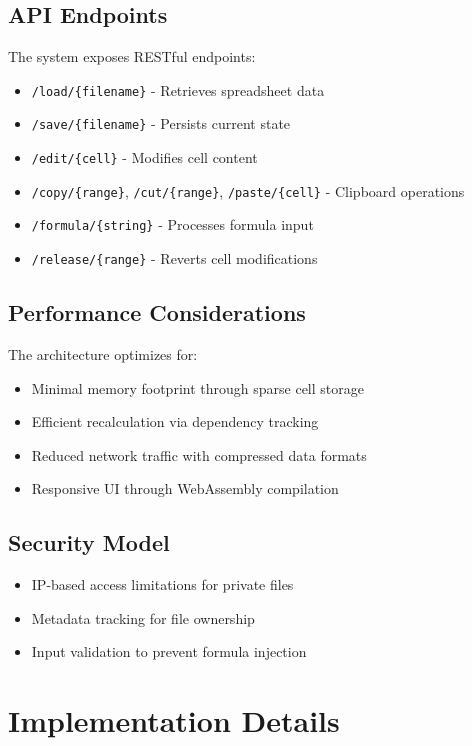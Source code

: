 \documentclass[10pt,a4paper]{article}  %
\begin{document}
\subsection{API Endpoints}

The system exposes RESTful endpoints:
\begin{itemize}
    \item \texttt{/load/\{filename\}} - Retrieves spreadsheet data
    \item \texttt{/save/\{filename\}} - Persists current state
    \item \texttt{/edit/\{cell\}} - Modifies cell content
    \item \texttt{/copy/\{range\}}, \texttt{/cut/\{range\}}, \texttt{/paste/\{cell\}} - Clipboard operations
    \item \texttt{/formula/\{string\}} - Processes formula input
    \item \texttt{/release/\{range\}} - Reverts cell modifications
\end{itemize}

\subsection{Performance Considerations}

The architecture optimizes for:
\begin{itemize}
    \item Minimal memory footprint through sparse cell storage
    \item Efficient recalculation via dependency tracking
    \item Reduced network traffic with compressed data formats
    \item Responsive UI through WebAssembly compilation
\end{itemize}

\subsection{Security Model}

\begin{itemize}
    \item IP-based access limitations for private files
    \item Metadata tracking for file ownership
    \item Input validation to prevent formula injection
\end{itemize}

\section{Implementation Details}
\end{document}
